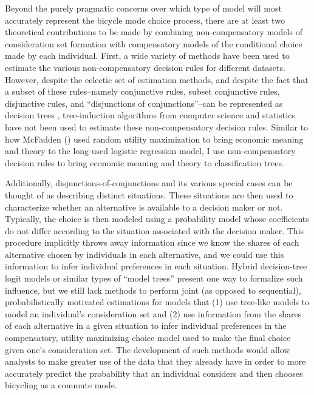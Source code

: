 \documentclass{article}
\begin{document}
Beyond the purely pragmatic concerns over which type of model will most accurately represent the bicycle mode choice process, there are at least two theoretical contributions to be made by combining non-compensatory models of consideration set formation with compensatory models of the conditional choice made by each individual.  First, a wide variety of methods have been used to estimate the various non-compensatory decision rules for different datasets. However, despite the eclectic set of estimation methods, and despite the fact that a subset of these rules--namely conjunctive rules, subset conjunctive rules, disjunctive rules, and ``disjunctions of conjunctions''--can be represented as decision trees \citep{hauser_disjunctions_2010}, tree-induction algorithms from computer science and statistics have not been used to estimate these non-compensatory decision rules.  Similar to how McFadden (\citeyear{mcfadden_conditional_1972}) used random utility maximization to bring economic meaning and theory to the long-used logistic regression model, I use non-compensatory decision rules to bring economic meaning and theory to classification trees.

Additionally, disjunctions-of-conjunctions and its various special cases can be thought of as describing distinct situations. These situations are then used to characterize whether an alternative is available to a decision maker or not. Typically, the choice is then modeled using a probability model whose coefficients do not differ according to the situation associated with the decision maker. This procedure implicitly throws away information since we know the shares of each alternative chosen by individuals in each alternative, and we could use this information to infer individual preferences in each situation. Hybrid decision-tree logit models \citep{steinberg_hybrid_1998} or similar types of ``model trees'' present one way to formalize such influence, but we still lack methods to perform joint (as opposed to sequential), probabilistically motivated estimations for models that (1) use tree-like models to model an individual's consideration set and (2) use information from the shares of each alternative in a given situation to infer individual preferences in the compensatory, utility maximizing choice model used to make the final choice given one's consideration set. The development of such methods would allow analysts to make greater use of the data that they already have in order to more accurately predict the probability that an individual considers and then chooses bicycling as a commute mode.
\end{document}
